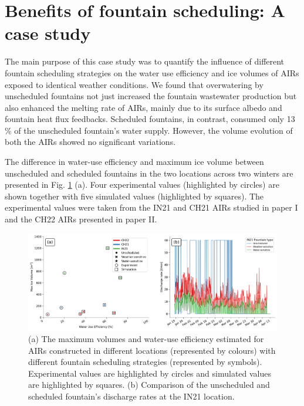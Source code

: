 \section{Benefits of fountain scheduling: A case study}

The main purpose of this case study was to quantify the influence of different fountain scheduling strategies on
the water use efficiency and ice volumes of AIRs exposed to identical weather conditions. We found that
overwatering by unscheduled fountains not just increased the fountain wastewater production but also enhanced
the melting rate of AIRs, mainly due to its surface albedo and fountain heat flux feedbacks. Scheduled
fountains, in contrast, consumed only 13 \% of the unscheduled fountain's water supply. However, the volume
evolution of both the AIRs showed no significant variations. 

The difference in water-use efficiency and maximum ice volume between unscheduled and scheduled fountains in the two
locations across two winters are presented in Fig. \ref{fig:wue} (a). Four experimental values (highlighted by
circles) are shown together with five simulated values (highlighted by squares).  The experimental values were
taken from the IN21 and CH21 AIRs studied in paper I and
the CH22 AIRs presented in paper II. 

\begin{figure}[t]
\includegraphics[width=\textwidth]{figs/wue.png}

\caption{(a) The maximum volumes and water-use efficiency estimated for AIRs constructed in different locations
(represented by colours) with different fountain scheduling strategies (represented by symbols). Experimental
values are highlighted by circles and simulated values are highlighted by squares. (b) Comparison of
the unscheduled and scheduled fountain's discharge rates at the IN21 location.}

\label{fig:wue}
\end{figure}


